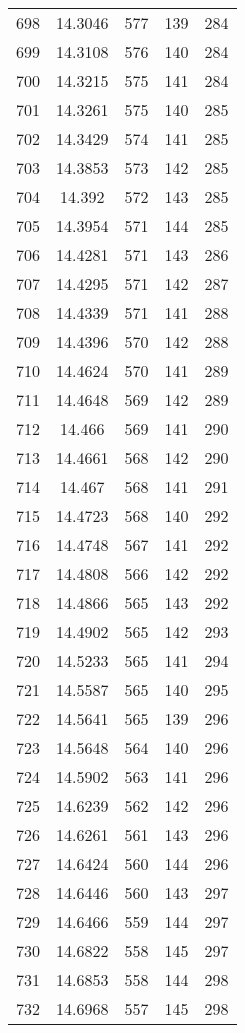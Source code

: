 \documentclass[12pt,a4paper]{article}
\begin{document}
\begin{tabular}{r|cccc}
	698 & 14.3046 & 577 & 139 & 284 \\
	699 & 14.3108 & 576 & 140 & 284 \\
	700 & 14.3215 & 575 & 141 & 284 \\
	701 & 14.3261 & 575 & 140 & 285 \\
	702 & 14.3429 & 574 & 141 & 285 \\
	703 & 14.3853 & 573 & 142 & 285 \\
	704 & 14.392 & 572 & 143 & 285 \\
	705 & 14.3954 & 571 & 144 & 285 \\
	706 & 14.4281 & 571 & 143 & 286 \\
	707 & 14.4295 & 571 & 142 & 287 \\
	708 & 14.4339 & 571 & 141 & 288 \\
	709 & 14.4396 & 570 & 142 & 288 \\
	710 & 14.4624 & 570 & 141 & 289 \\
	711 & 14.4648 & 569 & 142 & 289 \\
	712 & 14.466 & 569 & 141 & 290 \\
	713 & 14.4661 & 568 & 142 & 290 \\
	714 & 14.467 & 568 & 141 & 291 \\
	715 & 14.4723 & 568 & 140 & 292 \\
	716 & 14.4748 & 567 & 141 & 292 \\
	717 & 14.4808 & 566 & 142 & 292 \\
	718 & 14.4866 & 565 & 143 & 292 \\
	719 & 14.4902 & 565 & 142 & 293 \\
	720 & 14.5233 & 565 & 141 & 294 \\
	721 & 14.5587 & 565 & 140 & 295 \\
	722 & 14.5641 & 565 & 139 & 296 \\
	723 & 14.5648 & 564 & 140 & 296 \\
	724 & 14.5902 & 563 & 141 & 296 \\
	725 & 14.6239 & 562 & 142 & 296 \\
	726 & 14.6261 & 561 & 143 & 296 \\
	727 & 14.6424 & 560 & 144 & 296 \\
	728 & 14.6446 & 560 & 143 & 297 \\
	729 & 14.6466 & 559 & 144 & 297 \\
	730 & 14.6822 & 558 & 145 & 297 \\
	731 & 14.6853 & 558 & 144 & 298 \\
	732 & 14.6968 & 557 & 145 & 298 \\

\end{tabular}
\end{document}
